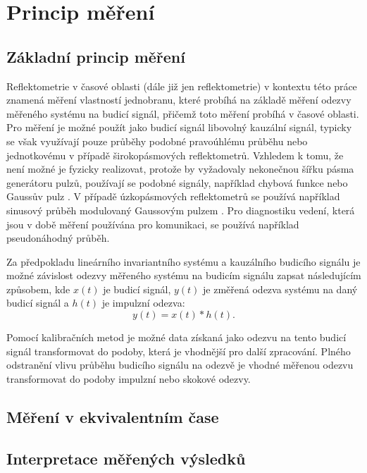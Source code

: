 \chapter{Princip měření}

\section{Základní princip měření}
Reflektometrie v časové oblasti (dále již jen reflektometrie) v kontextu této práce znamená měření vlastností jednobranu, které probíhá na základě měření odezvy měřeného systému na budicí signál, přičemž toto měření probíhá v časové oblasti. Pro měření je možné použít jako budicí signál libovolný kauzální signál, typicky se však využívají pouze průběhy podobné pravoúhlému průběhu nebo jednotkovému v případě širokopásmových reflektometrů. Vzhledem k tomu, že není možné je fyzicky realizovat, protože by vyžadovaly nekonečnou šířku pásma generátoru pulzů, používají se podobné signály, například chybová funkce \cite{S-4manual} nebo Gaussův pulz \cite{ultrawidebandsignals}. V případě úzkopásmových reflektometrů se používá například sinusový průběh modulovaný Gaussovým pulzem \cite{sincgausstdr}. Pro diagnostiku vedení, která jsou v době měření používána pro komunikaci, se používá například pseudonáhodný průběh.

Za předpokladu lineárního invariantního systému a kauzálního budicího signálu je možné závislost odezvy měřeného systému na budicím signálu zapsat následujícím způsobem, kde $x(t)$ je budicí signál, $y(t)$ je změřená odezva systému na daný budicí signál a $h(t)$ je impulzní odezva:
\begin{equation}
y(t)=x(t) \ast h(t).
\end{equation}


Pomocí kalibračních metod je možné data získaná jako odezvu na tento budicí signál transformovat do podoby, která je vhodnější pro další zpracování. Plného odstranění vlivu průběhu budicího signálu na odezvě je vhodné měřenou odezvu transformovat do podoby impulzní nebo skokové odezvy.

\section{Měření v ekvivalentním čase}

\section{Interpretace měřených výsledků}



